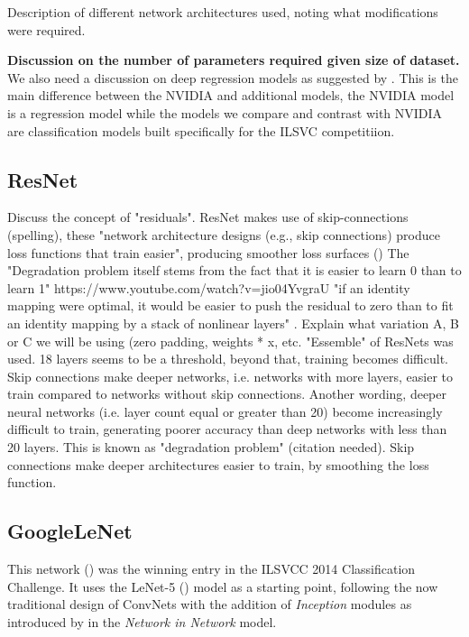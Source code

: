 Description of different network architectures used, noting what modifications were required.  

\textbf{Discussion on the number of parameters required given size of dataset.}  
We also need a discussion on deep regression models as suggested by \cite{lathuilire2018comprehensive}. This is the main difference between the NVIDIA and additional models, the NVIDIA model is a regression model while the models we compare and contrast with NVIDIA are classification models built specifically for the ILSVC  competitiion.

\subsection{ResNet}

Discuss the concept of "residuals". ResNet makes use of skip-connections (spelling), these "network architecture
designs (e.g., skip connections) produce loss functions that train easier", producing smoother loss surfaces (\cite{li2017visualizing})  
The "Degradation problem itself stems from the fact that it is easier to learn 0 than to learn 1"   https://www.youtube.com/watch?v=jio04YvgraU
"if an identity mapping were optimal, it would be easier to push the residual to zero than to fit an identity mapping by a stack of nonlinear layers" \cite{he2015deep}.  
Explain what variation A, B or C we will be using (zero padding, weights * x, etc.  
"Essemble" of ResNets was used.  
18 layers seems to be a threshold, beyond that, training becomes difficult. Skip connections make deeper networks, i.e. networks with more layers, easier to train compared to networks without skip connections.  
Another wording, deeper neural networks (i.e. layer count equal or greater than 20) become increasingly difficult to train, generating poorer accuracy than deep networks with less than 20 layers. This is known as "degradation problem" (citation needed). Skip connections make deeper architectures easier to train, by smoothing the loss function.

\subsection{GoogleLeNet}

This network (\cite{szegedy2014going}) was the winning entry in the ILSVCC 2014 Classification Challenge. It uses the LeNet-5 (\cite{Lecun98gradient-basedlearning}) model as a starting point, following the now traditional design of ConvNets with the addition of \textit{Inception} modules as introduced by \cite{lin2013network} in the \textit{Network in Network} model.

